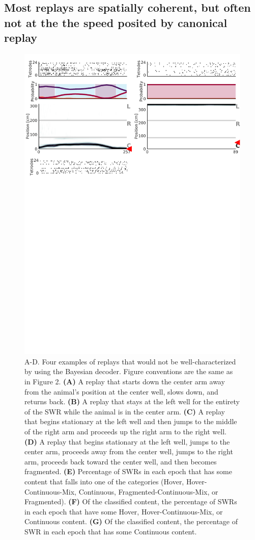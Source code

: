 \documentclass[times, twoside]{zHenriquesLab-StyleBioRxiv}
\begin{document}
\subsection*{Most replays are spatially coherent, but often not at the the speed posited by canonical replay}

\begin{figure}%
\centering
\includegraphics[width=0.80\linewidth]{figures/Figure3/Figure3_v3}
\caption{A-D. Four examples of replays that would not be well-characterized by using the Bayesian decoder. Figure conventions are the same as in Figure 2. \textbf{(A)} A replay that starts down the center arm away from the animal's position at the center well, slows down, and returns back. \textbf{(B)} A replay that stays at the left well for the entirety of the SWR while the animal is in the center arm. \textbf{(C)} A replay that begins stationary at the left well and then jumps to the middle of the right arm and proceeds up the right arm to the right well. \textbf{(D)} A replay that begins stationary at the left well, jumps to the center arm, proceeds away from the center well, jumps to the right arm, proceeds back toward the center well, and then becomes fragmented. \textbf{(E)} Percentage of SWRs in each epoch that has some content that falls into one of the categories (Hover, Hover-Continuous-Mix, Continuous, Fragmented-Continuous-Mix, or Fragmented). \textbf{(F)} Of the classified content, the percentage of SWRs in each epoch that have some Hover, Hover-Continuous-Mix, or Continuous content. \textbf{(G)} Of the classified content, the percentage of SWR in each epoch that has some Continuous content.
}
\label{Figure3}
\end{figure}
\end{document}
